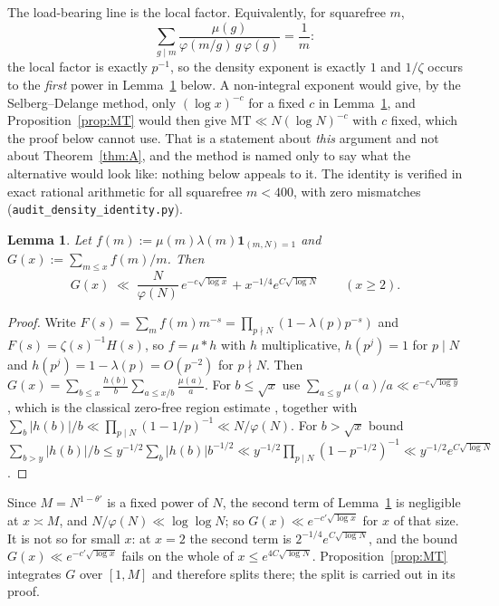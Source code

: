 \documentclass[11pt,a4paper]{article}
\theoremstyle{plain}
\newtheorem{lemma}[theorem]{Lemma}
\theoremstyle{definition}
\theoremstyle{remark}
\begin{document}
The load-bearing line is the local factor. Equivalently, for squarefree
$m$,
\[
  \sum_{g\mid m}\frac{\mu(g)}{\varphi(m/g)\,g\,\varphi(g)}=\frac1m :
\]
the local factor is exactly $p^{-1}$, so the density exponent is
exactly $1$ and $1/\zeta$ occurs to the \emph{first} power in
Lemma~\ref{lem:mu} below. A non-integral exponent would give, by
the Selberg--Delange method, only $(\log x)^{-c}$ for a fixed $c$ in
Lemma~\ref{lem:mu}, and Proposition~\ref{prop:MT} would then give
$\mathrm{MT}\ll N(\log N)^{-c}$ with $c$ fixed, which the proof below
cannot use. That is a statement about \emph{this} argument and not
about Theorem~\ref{thm:A}, and the method is named only to say what
the alternative would look like: nothing below appeals to it. The
identity is verified in exact rational arithmetic for all squarefree
$m<400$, with zero mismatches
(\texttt{audit\_density\_identity.py}).

\begin{lemma}\label{lem:mu}
Let $f(m):=\mu(m)\lambda(m)\mathbf 1_{(m,N)=1}$ and
$G(x):=\sum_{m\le x}f(m)/m$. Then
\[
  G(x)\;\ll\;\frac{N}{\varphi(N)}\,e^{-c\sqrt{\log x}}
   +x^{-1/4}e^{C\sqrt{\log N}}
   \qquad(x\ge2).
\]
\end{lemma}

\begin{proof}
Write $F(s)=\sum_m f(m)m^{-s}=\prod_{p\nmid N}(1-\lambda(p)p^{-s})$
and $F(s)=\zeta(s)^{-1}H(s)$, so $f=\mu*h$ with $h$ multiplicative,
$h(p^j)=1$ for $p\mid N$ and $h(p^j)=1-\lambda(p)=O(p^{-2})$ for
$p\nmid N$. Then
$G(x)=\sum_{b\le x}\frac{h(b)}{b}\sum_{a\le x/b}\frac{\mu(a)}{a}$. For
$b\le\sqrt x$ use $\sum_{a\le y}\mu(a)/a\ll e^{-c\sqrt{\log y}}$, which
is the classical zero-free region estimate \cite{MoV}, together with
$\sum_b|h(b)|/b\ll\prod_{p\mid N}(1-1/p)^{-1}\ll N/\varphi(N)$. For
$b>\sqrt x$ bound
$\sum_{b>y}|h(b)|/b\le y^{-1/2}\sum_b|h(b)|b^{-1/2}
\ll y^{-1/2}\prod_{p\mid N}(1-p^{-1/2})^{-1}\ll y^{-1/2}e^{C\sqrt{\log N}}$.
\end{proof}

Since $M=N^{1-\theta'}$ is a fixed power of $N$, the second term of
Lemma~\ref{lem:mu} is negligible at $x\asymp M$, and
$N/\varphi(N)\ll\log\log N$; so $G(x)\ll e^{-c'\sqrt{\log x}}$ for $x$
of that size. It is not so for small $x$: at $x=2$ the second term is
$2^{-1/4}e^{C\sqrt{\log N}}$, and the bound
$G(x)\ll e^{-c'\sqrt{\log x}}$ fails on the whole of
$x\le e^{4C\sqrt{\log N}}$. Proposition~\ref{prop:MT} integrates $G$
over $[1,M]$ and therefore splits there; the split is carried out in
its proof.
\end{document}
